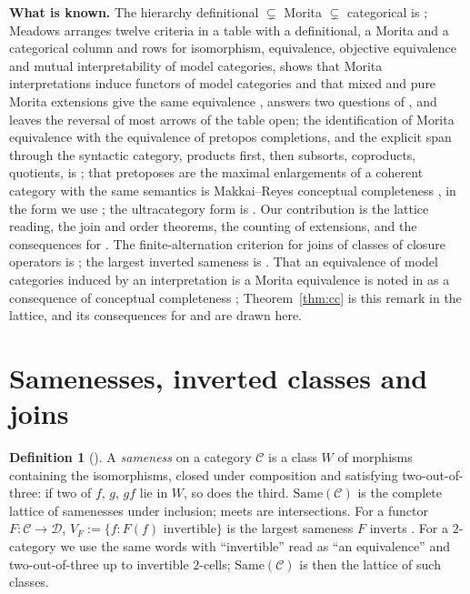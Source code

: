\documentclass[11pt]{amsart}
\theoremstyle{definition}
\newtheorem{defi}[thm]{Definition}
\newcommand{\Same}{\mathrm{Same}}
\newcommand{\cC}{\mathcal C}
\newcommand{\cD}{\mathcal D}
\begin{document}
\medskip
\noindent\textbf{What is known.} The hierarchy definitional $\subsetneq$
Morita $\subsetneq$ categorical is \cite{BH16}; Meadows \cite{Meadows24}
arranges twelve criteria in a table with a definitional, a Morita and a
categorical column and rows for isomorphism, equivalence, objective
equivalence and mutual interpretability of model categories, shows that
Morita interpretations induce functors of model categories
\cite[Thm.~42]{Meadows24} and that mixed and pure Morita extensions
give the same equivalence \cite[Cor.~47]{Meadows24}, answers two
questions of \cite{BH16}, and leaves the reversal of most arrows of the
table open; the identification of
Morita equivalence with the equivalence of pretopos completions, and the
explicit span through the syntactic category, products first, then
subsorts, coproducts, quotients, is \cite{Tsem17}; that pretoposes are
the maximal enlargements of a coherent category with the same semantics
is Makkai--Reyes conceptual completeness \cite{MR77}, in the form we use
\cite[Cor.~12, Rem.~13]{LurieNotes}; the ultracategory form is
\cite{Makkai88}. Our contribution is the lattice reading, the join and
order theorems, the counting of extensions, and the consequences for
\cite{BH16,Hudetz19,KSLF20,Meadows24}. The finite-alternation criterion for joins
of classes of closure operators is \cite[Thm.~2.3]{Cutpoints}; the
largest inverted sameness is \cite{Same}. That an equivalence of
model categories induced by an interpretation is a Morita equivalence is
noted in \cite[\S1.3, fn.~8]{HT17} as a consequence of conceptual
completeness \cite[D3.5.9]{Elephant}; Theorem~\ref{thm:cc} is this
remark in the lattice, and its consequences for \cite{Hudetz19} and
\cite{Meadows24} are drawn here.

\section{Samenesses, inverted classes and joins}\label{sec:same}

\begin{defi}[\cite{Same}]
A \emph{sameness} on a category $\cC$ is a class $W$ of morphisms
containing the isomorphisms, closed under composition and satisfying
two-out-of-three: if two of $f$, $g$, $gf$ lie in $W$, so does the
third. $\Same(\cC)$ is the complete lattice of samenesses under
inclusion; meets are intersections. For a functor $F\colon\cC\to\cD$,
$V_F:=\{f:F(f)\text{ invertible}\}$ is the largest sameness $F$ inverts
\cite[Prop.~5.1]{Same}. For a $2$-category we use the same words with
``invertible'' read as ``an equivalence'' and two-out-of-three up to
invertible $2$-cells; $\Same(\cC)$ is then the lattice of such classes.
\end{defi}
\end{document}
